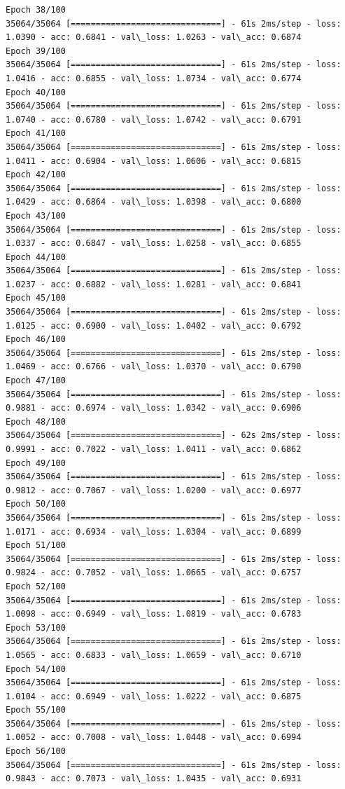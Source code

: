 \documentclass[11pt]{article}
\begin{document}
\begin{Verbatim}[commandchars=\\\{\}]
Epoch 38/100
35064/35064 [==============================] - 61s 2ms/step - loss: 1.0390 - acc: 0.6841 - val\_loss: 1.0263 - val\_acc: 0.6874
Epoch 39/100
35064/35064 [==============================] - 61s 2ms/step - loss: 1.0416 - acc: 0.6855 - val\_loss: 1.0734 - val\_acc: 0.6774
Epoch 40/100
35064/35064 [==============================] - 61s 2ms/step - loss: 1.0740 - acc: 0.6780 - val\_loss: 1.0742 - val\_acc: 0.6791
Epoch 41/100
35064/35064 [==============================] - 61s 2ms/step - loss: 1.0411 - acc: 0.6904 - val\_loss: 1.0606 - val\_acc: 0.6815
Epoch 42/100
35064/35064 [==============================] - 61s 2ms/step - loss: 1.0429 - acc: 0.6864 - val\_loss: 1.0398 - val\_acc: 0.6800
Epoch 43/100
35064/35064 [==============================] - 61s 2ms/step - loss: 1.0337 - acc: 0.6847 - val\_loss: 1.0258 - val\_acc: 0.6855
Epoch 44/100
35064/35064 [==============================] - 61s 2ms/step - loss: 1.0237 - acc: 0.6882 - val\_loss: 1.0281 - val\_acc: 0.6841
Epoch 45/100
35064/35064 [==============================] - 61s 2ms/step - loss: 1.0125 - acc: 0.6900 - val\_loss: 1.0402 - val\_acc: 0.6792
Epoch 46/100
35064/35064 [==============================] - 61s 2ms/step - loss: 1.0469 - acc: 0.6766 - val\_loss: 1.0370 - val\_acc: 0.6790
Epoch 47/100
35064/35064 [==============================] - 61s 2ms/step - loss: 0.9881 - acc: 0.6974 - val\_loss: 1.0342 - val\_acc: 0.6906
Epoch 48/100
35064/35064 [==============================] - 62s 2ms/step - loss: 0.9991 - acc: 0.7022 - val\_loss: 1.0411 - val\_acc: 0.6862
Epoch 49/100
35064/35064 [==============================] - 61s 2ms/step - loss: 0.9812 - acc: 0.7067 - val\_loss: 1.0200 - val\_acc: 0.6977
Epoch 50/100
35064/35064 [==============================] - 61s 2ms/step - loss: 1.0171 - acc: 0.6934 - val\_loss: 1.0304 - val\_acc: 0.6899
Epoch 51/100
35064/35064 [==============================] - 61s 2ms/step - loss: 0.9824 - acc: 0.7052 - val\_loss: 1.0665 - val\_acc: 0.6757
Epoch 52/100
35064/35064 [==============================] - 61s 2ms/step - loss: 1.0098 - acc: 0.6949 - val\_loss: 1.0819 - val\_acc: 0.6783
Epoch 53/100
35064/35064 [==============================] - 61s 2ms/step - loss: 1.0565 - acc: 0.6833 - val\_loss: 1.0659 - val\_acc: 0.6710
Epoch 54/100
35064/35064 [==============================] - 61s 2ms/step - loss: 1.0104 - acc: 0.6949 - val\_loss: 1.0222 - val\_acc: 0.6875
Epoch 55/100
35064/35064 [==============================] - 61s 2ms/step - loss: 1.0052 - acc: 0.7008 - val\_loss: 1.0448 - val\_acc: 0.6994
Epoch 56/100
35064/35064 [==============================] - 61s 2ms/step - loss: 0.9843 - acc: 0.7073 - val\_loss: 1.0435 - val\_acc: 0.6931

\end{Verbatim}
\end{document}

